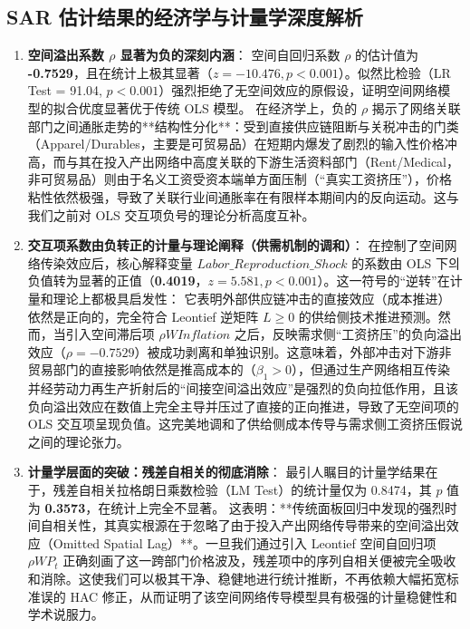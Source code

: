 \documentclass[UTF8,a4paper,11pt]{ctexart}
\begin{document}
\subsection{SAR 估计结果的经济学与计量学深度解析}
\begin{enumerate}
    \item \textbf{空间溢出系数 $\rho$ 显著为负的深刻内涵}：
    空间自回归系数 $\rho$ 的估计值为 \textbf{-0.7529}，且在统计上极其显著（$z = -10.476, p < 0.001$）。似然比检验（LR Test = 91.04, $p < 0.001$）强烈拒绝了无空间效应的原假设，证明空间网络模型的拟合优度显著优于传统 OLS 模型。
    在经济学上，负的 $\rho$ 揭示了网络关联部门之间通胀走势的**结构性分化**：受到直接供应链阻断与关税冲击的门类（Apparel/Durables，主要是可贸易品）在短期内爆发了剧烈的输入性价格冲高，而与其在投入产出网络中高度关联的下游生活资料部门（Rent/Medical，非可贸易品）则由于名义工资受资本端单方面压制（“真实工资挤压”），价格粘性依然极强，导致了关联行业间通胀率在有限样本期间内的反向运动。这与我们之前对 OLS 交互项负号的理论分析高度互补。
    
    \item \textbf{交互项系数由负转正的计量与理论阐释（供需机制的调和）}：
    在控制了空间网络传染效应后，核心解释变量 $Labor\_Reproduction\_Shock$ 的系数由 OLS 下의 负值转为显著的正值（\textbf{0.4019}，$z = 5.581, p < 0.001$）。这一符号的“逆转”在计量和理论上都极具启发性：
    它表明外部供应链冲击的直接效应（成本推进）依然是正向的，完全符合 Leontief 逆矩阵 $L \ge 0$ 的供给侧技术推进预测。然而，当引入空间滞后项 $\rho W Inflation$ 之后，反映需求侧“工资挤压”的负向溢出效应（$\rho = -0.7529$）被成功剥离和单独识别。这意味着，外部冲击对下游非贸易部门的直接影响依然是推高成本的（$\beta_1 > 0$），但通过生产网络相互传染并经劳动力再生产折射后的“间接空间溢出效应”是强烈的负向拉低作用，且该负向溢出效应在数值上完全主导并压过了直接的正向推进，导致了无空间项的 OLS 交互项呈现负值。这完美地调和了供给侧成本传导与需求侧工资挤压假说之间的理论张力。

    \item \textbf{计量学层面的突破：残差自相关的彻底消除}：
    最引人瞩目的计量学结果在于，残差自相关拉格朗日乘数检验（LM Test）的统计量仅为 0.8474，其 $p$ 值为 \textbf{0.3573}，在统计上完全不显著。
    这表明：**传统面板回归中发现的强烈时间自相关性，其真实根源在于忽略了由于投入产出网络传导带来的空间溢出效应（Omitted Spatial Lag）**。一旦我们通过引入 Leontief 空间自回归项 $\rho W P_t$ 正确刻画了这一跨部门价格波及，残差项中的序列自相关便被完全吸收和消除。这使我们可以极其干净、稳健地进行统计推断，不再依赖大幅拓宽标准误的 HAC 修正，从而证明了该空间网络传导模型具有极强的计量稳健性和学术说服力。


\end{enumerate}
\end{document}
